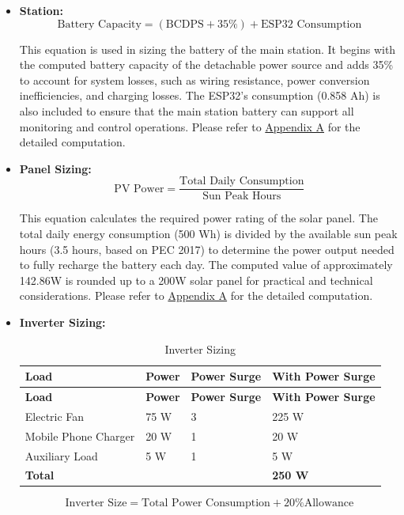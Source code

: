 {\begin{itemize}
 	\item\textbf{ Station:} 
 	\begin{equation}
 		\text{Battery Capacity} =
 		\left( 
 		\text{BCDPS}
 		+ 35\%
 		\right)
 		+ \text{ESP32 Consumption}
 		\label{eq:Station}
 	\end{equation}
 	
 	
 	This equation is used in sizing the battery of the main station. It begins with the computed battery capacity of the detachable power source and adds 35\% to account for system losses, such as wiring resistance, power conversion inefficiencies, and charging losses. The ESP32’s consumption (0.858 Ah) is also included to ensure that the main station battery can support all monitoring and control operations. Please refer to \hyperref[appendix:A]{Appendix A} for the detailed computation.
 	
 	\item\textbf{ Panel Sizing:} 
 	\begin{equation}
 		\text{PV Power} =
 		\frac{\text{Total Daily Consumption}}{\text{Sun Peak Hours}}
 		\label{eq:panel}
 	\end{equation}
 	
 	
 	This equation calculates the required power rating of the solar panel. The total daily energy consumption (500 Wh) is divided by the available sun peak hours (3.5 hours, based on PEC 2017) to determine the power output needed to fully recharge the battery each day. The computed value of approximately 142.86W is rounded up to a 200W solar panel for practical and technical considerations. Please refer to \hyperref[appendix:A]{Appendix A} for the detailed computation.
 	
 	\item \textbf{Inverter Sizing:} 
 	\begin{longtable}{p{4cm} p{1.5cm} p{2.2cm} p{4.2cm}}
 		\caption{Inverter Sizing} \label{tab:InverterSizing} \\
 		\toprule
 		\textbf{Load} & \textbf{Power} & \textbf{Power Surge} & \textbf{With Power Surge} \\
 		\midrule
 		\endfirsthead
 		
 		\toprule
 		\textbf{Load} & \textbf{Power} & \textbf{Power Surge} & \textbf{With Power Surge} \\
 		\midrule
 		\endhead
 		
 		\bottomrule
 		\endfoot
 		
 		Electric Fan & 75 W & 3 & 225 W \\
 		Mobile Phone Charger & 20 W & 1 & 20 W \\
 		Auxiliary Load & 5 W & 1 & 5 W \\
 		\midrule
 		\textbf{Total} & & & \textbf{250 W} \\
 	\end{longtable}
 	\begin{equation}
 		\text{Inverter Size} =
 		\text{Total Power Consumption} + 20\% \text{Allowance}
 		\label{eq:inverter}
 	\end{equation}
 	

\end{itemize}}
